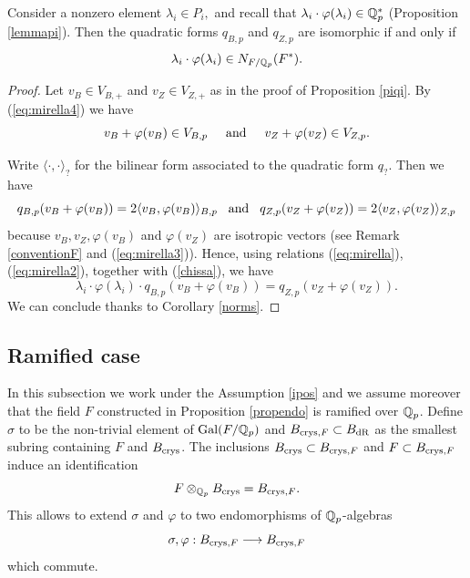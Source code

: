 \documentclass[11pt]{amsart}
\begin{document}
\begin{prop}\label{warmbrinon}
Consider a nonzero element $\lambda_i \in P_i,$ and recall that $\lambda_i \cdot\varphi(\lambda_i) \in \mathbb{Q}^*_p$ (Proposition \ref{lemmapi}).  Then the quadratic forms $q_{B,p}$ and $q_{Z,p}$ are isomorphic if and only if
 \[\lambda_i \cdot\varphi(\lambda_i) \in N_{F/\mathbb{Q}_p}(F^*).\] 
\end{prop}
\begin{proof}
Let $v_B \in V_{B,+}$ and $v_Z \in V_{Z,+}$ as in the proof of Proposition \ref{piqi}.  By (\ref{eq:mirella4}) we have
\begin{equation} \label{eq:mirella9}v_B + \varphi(v_{B})  \in  V_{B,p} \hspace{0.5cm}  \textrm{and} \hspace{0.5cm}    v_Z + \varphi(v_{Z})  \in  V_{Z,p}. 
\end{equation}

Write  $\langle \cdot  ,  \cdot \rangle_{?}$ for the bilinear form associated to the quadratic form $q_?$. Then we have
\[q_{B,p}(v_B + \varphi(v_{B}) ) = 2 \langle v_B ,  \varphi(v_{B}) \rangle_{B,p}  \hspace{0.3cm}  \textrm{and}   \hspace{0.3cm} q_{Z,p}(v_Z + \varphi(v_{Z}) ) = 2 \langle v_Z ,  \varphi(v_{Z}) \rangle_{Z,p}  \]
because    $v_B,v_Z,\varphi(v_B)$ and $\varphi(v_Z)$ are isotropic vectors (see Remark \ref{conventionF} and (\ref{eq:mirella3})). 
Hence, using  relations  (\ref{eq:mirella}), (\ref{eq:mirella2}), together with (\ref{chissa}), we have
\[\lambda_i \cdot\varphi(\lambda_i) \cdot q_{B,p}(v_B + \varphi(v_{B}) ) =  q_{Z,p}(v_Z + \varphi(v_{Z}) ) . \]
We can conclude thanks to Corollary \ref{norms}.
\end{proof}

\subsection*{Ramified case}\label{ramcase}


In this subsection we work under the Assumption  \ref{ipos} and we assume moreover that the field $F$  constructed in  Proposition \ref{propendo} is ramified over $\mathbb{Q}_p$.
Define $\sigma$ to be the  non-trivial element of $\textnormal{Gal}(F/\mathbb{Q}_p)$ and $  B_{\textnormal{crys},F} \subset B_{\mathrm{dR}}$ as the smallest subring containing $F$ and  $B_{\textnormal{crys}}$.
The inclusions   $  B_{\textnormal{crys}} \subset B_{\textnormal{crys},F}$ and  $  F \subset B_{\textnormal{crys},F}$ induce an identification
\[F\otimes_{\mathbb{Q}_p} B_{\textnormal{crys}}=B_{\textnormal{crys},F}. \]
This allows  to extend $\sigma$ and $\varphi$ to two endomorphisms of $\mathbb{Q}_p$-algebras
\[   \sigma, \varphi : B_{\textnormal{crys},F}    \longrightarrow B_{\textnormal{crys},F} \]
which commute.
\end{document}
